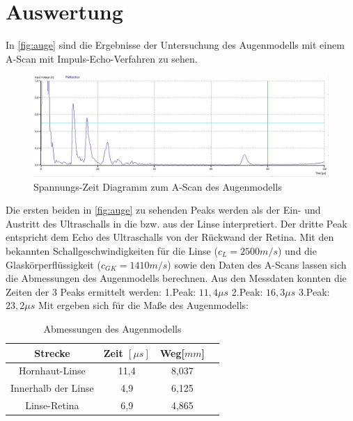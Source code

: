 \section{Auswertung}
\label{sec:Auswertung}

In \autoref{fig:auge} sind die Ergebnisse der Untersuchung des Augenmodells mit einem A-Scan mit Impuls-Echo-Verfahren zu sehen.
\begin{figure}[H]
  \centering
  \includegraphics[width=\textwidth]{messungen/auge/auge.jpg}
  \caption{Spannungs-Zeit Diagramm zum A-Scan des Augenmodells}
  \label{fig:auge}
\end{figure}

\cite{sample}
Die ersten beiden in \autoref{fig:auge} zu sehenden Peaks werden als der Ein- und Austritt des Ultraschalls in die bzw. aus der Linse interpretiert. Der dritte Peak entspricht dem Echo des Ultraschalls von der Rückwand der Retina. Mit den bekannten Schallgeschwindigkeiten für die Linse ($c_{L} = 2500 m/s$) und die Glaskörperflüssigkeit ($c_{GK} = 1410 m/s$) sowie den Daten des A-Scans lassen sich die Abmessungen des Augenmodells berechnen. Aus den Messdaten konnten die Zeiten der 3 Peaks ermittelt werden:\newline
1.Peak: $11,4 \mu s$ \newline 2.Peak: $16,3 \mu s$ \newline 3.Peak: $23,2 \mu s$ \newline
Mit ergeben sich für die Maße des Augenmodells:
\begin{table}
  \centering
  \caption{Abmessungen des Augenmodells}
\label{tab:mess2}
  \begin{tabular}{c c c c}
  \toprule
  Strecke & Zeit $[\mu s]$ & Weg[$mm$]\\
  \midrule
  Hornhaut-Linse & 11,4 & 8,037 \\
  Innerhalb der Linse & 4,9 & 6,125\\
  Linse-Retina & 6,9 & 4,865\\
  \bottomrule
  \end{tabular}
  \end{table}